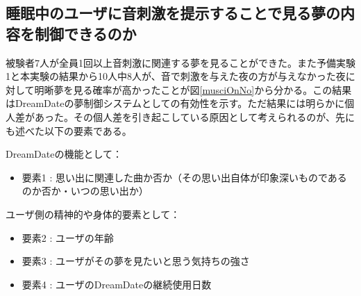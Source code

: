 \subsection{睡眠中のユーザに音刺激を提示することで見る夢の内容を制御できるのか} 
被験者7人が全員1回以上音刺激に関連する夢を見ることができた。また予備実験1と本実験の結果から10人中8人が、音で刺激を与えた夜の方が与えなかった夜に対して明晰夢を見る確率が高かったことが図\ref{musciOnNo}から分かる。この結果はDreamDateの夢制御システムとしての有効性を示す。ただ結果には明らかに個人差があった。その個人差を引き起こしている原因として考えられるのが、先にも述べた以下の要素である。

DreamDateの機能として：
\begin{itemize}
\item 要素1 : 思い出に関連した曲か否か（その思い出自体が印象深いものであるのか否か・いつの思い出か）
\end{itemize}
ユーザ側の精神的や身体的要素として：
\begin{itemize}
\item 要素2 : ユーザの年齢
\item 要素3 : ユーザがその夢を見たいと思う気持ちの強さ
\item 要素4 : ユーザのDreamDateの継続使用日数
\end{itemize}

